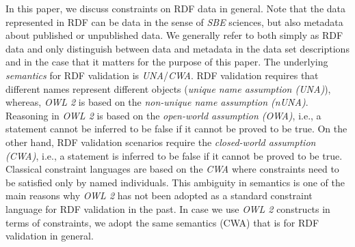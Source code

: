\documentclass{llncs}
\newcommand{\ms}[1]{\texttt{#1}}
\newcommand{\tb}[1]{\todo[size=\small, color=green!40]{\textbf{Thomas:} #1}}
\begin{document}
In this paper, we discuss constraints on RDF data in general. Note that the data represented in RDF can be data in the sense of \emph{SBE} sciences, but also metadata about published or unpublished data. We generally refer to both simply as RDF data and only distinguish between data and metadata in the data set descriptions and in the case that it matters for the purpose of this paper.
The underlying \emph{semantics} for RDF validation is \emph{UNA}/\emph{CWA}.
RDF validation requires that different names represent different objects ({\em unique name assumption (UNA)}), whereas,
\emph{OWL 2} is based on the {\em non-unique name assumption (nUNA)}.  
Reasoning in \emph{OWL 2} is based on the {\em open-world assumption (OWA)}, i.e., a statement cannot be inferred to be false if it cannot be proved to be true. 
On the other hand, RDF validation scenarios require the {\em closed-world assumption (CWA)}, i.e., a statement is inferred to be false if it cannot be proved to be true. Classical constraint languages are based on the \emph{CWA} where constraints need to be satisfied only by named individuals.
This ambiguity in semantics is one of the main reasons why \emph{OWL 2} has not been adopted as a standard constraint language for RDF validation in the past.  
In case we use \emph{OWL 2} constructs in terms of constraints, we adopt the same semantics (CWA) that is for RDF validation in general.
\end{document}
